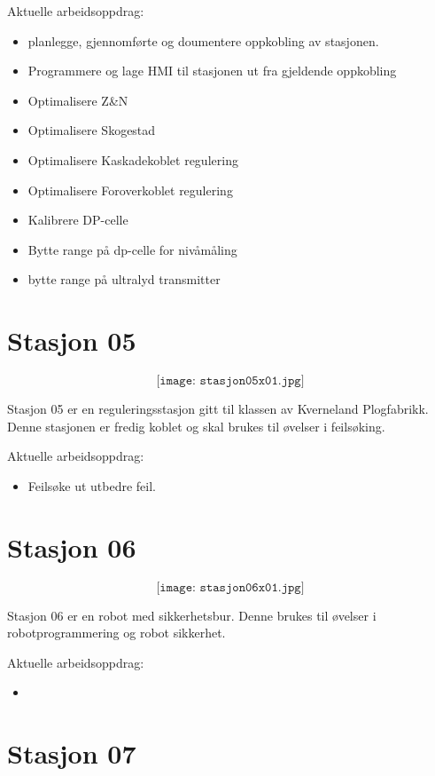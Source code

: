 Aktuelle arbeidsoppdrag:\\
\begin{itemize}[noitemsep]
	\item planlegge, gjennomførte og doumentere oppkobling av stasjonen.
	\item Programmere og lage HMI til stasjonen ut fra gjeldende oppkobling
	\item Optimalisere Z\&N
	\item Optimalisere Skogestad
	\item Optimalisere Kaskadekoblet regulering
	\item Optimalisere Foroverkoblet regulering
	\item Kalibrere DP-celle
	\item Bytte range på dp-celle for nivåmåling
	\item bytte range på ultralyd transmitter
\end{itemize}
\section{Stasjon 05}

$$\texttt{[image: stasjon05x01.jpg]}$$

Stasjon 05 er en reguleringsstasjon gitt til klassen av Kverneland Plogfabrikk. Denne stasjonen er fredig koblet og skal brukes til øvelser i feilsøking. 

Aktuelle arbeidsoppdrag:\\
\begin{itemize}[noitemsep]
	\item Feilsøke ut utbedre feil. 
\end{itemize}


\section{Stasjon 06}

$$\texttt{[image: stasjon06x01.jpg]}$$

Stasjon 06 er en robot med sikkerhetsbur. Denne brukes til øvelser i robotprogrammering og robot sikkerhet. 


Aktuelle arbeidsoppdrag:\\

\begin{itemize}[noitemsep]
	\item 
\end{itemize}


\section{Stasjon 07}


